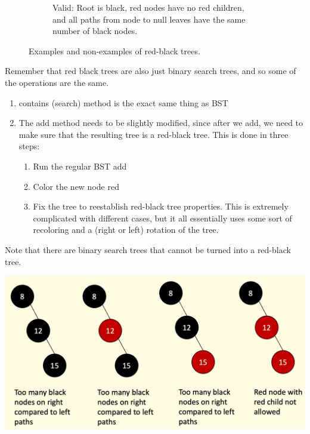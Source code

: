 \documentclass{article}
\begin{document}
\begin{definition}
\begin{figure}[H]
\begin{subfigure}[b]{0.32\textwidth}
          \caption{Valid: Root is black, red nodes have no red children, and all paths from node to null leaves have the same number of black nodes.}
          \label{fig:rb-valid}
        \end{subfigure}
        \caption{Examples and non-examples of red-black trees.}
        \label{fig:red-black-tree-examples}
      \end{figure}

      Remember that red black trees are also just binary search trees, and so some of the operations are the same.  
      \begin{enumerate}
        \item contains (search) method is the exact same thing as BST 
        \item The add method needs to be slightly modified, since after we add, we need to make sure that the resulting tree is a red-black tree. This is done in three steps: 
        \begin{enumerate}
          \item Run the regular BST add 
          \item Color the new node red 
          \item Fix the tree to reestablish red-black tree properties. This is extremely complicated with different cases, but it all essentially uses some sort of recoloring and a (right or left) rotation of the tree. 
        \end{enumerate}
      \end{enumerate}
    \end{definition}

    Note that there are binary search trees that cannot be turned into a red-black tree. 
    \begin{center}
      \includegraphics[scale=0.3]{img/impossible_red_black.png}
    \end{center}
\end{document}
